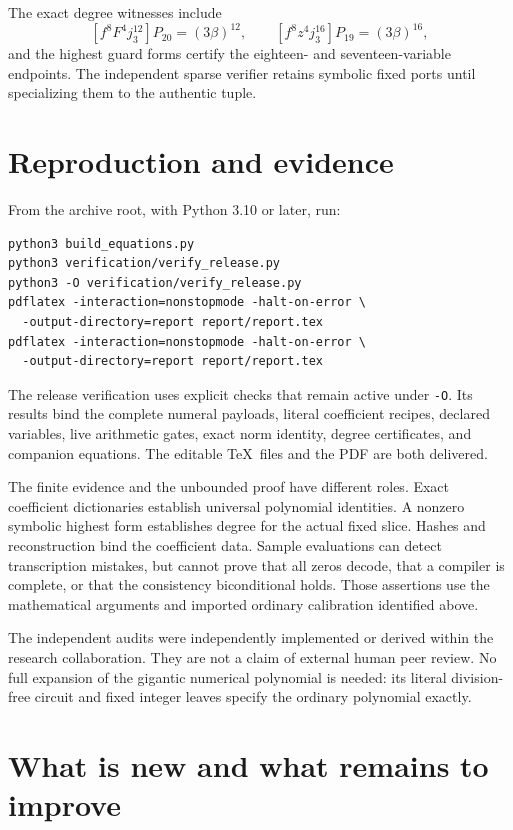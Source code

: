 \documentclass[11pt,a4paper]{article}
\theoremstyle{definition}\newtheorem{definition}[theorem]{Definition}
\theoremstyle{remark}\newtheorem{remark}[theorem]{Remark}
\numberwithin{equation}{section}
\begin{document}
The exact degree witnesses include
\[
[f^8F^4j_3^{12}]P_{20}=(3\beta)^{12},\qquad
[f^8z^4j_3^{16}]P_{19}=(3\beta)^{16},
\]
and the highest guard forms certify the eighteen- and
seventeen-variable endpoints. The independent sparse verifier
retains symbolic fixed ports until specializing them to the
authentic tuple.

\section{Reproduction and evidence}\label{sec:reproduce}

From the archive root, with Python 3.10 or later, run:
\begin{lstlisting}
python3 build_equations.py
python3 verification/verify_release.py
python3 -O verification/verify_release.py
pdflatex -interaction=nonstopmode -halt-on-error \
  -output-directory=report report/report.tex
pdflatex -interaction=nonstopmode -halt-on-error \
  -output-directory=report report/report.tex
\end{lstlisting}
The release verification uses explicit checks that remain active under
\texttt{-O}. Its results bind the complete numeral payloads,
literal coefficient recipes, declared variables, live arithmetic gates,
exact norm identity, degree certificates, and companion equations.
The editable \TeX\ files and the PDF are both delivered.

The finite evidence and the unbounded proof have different roles.
Exact coefficient dictionaries establish universal polynomial identities.
A nonzero symbolic highest form establishes degree for the actual
fixed slice. Hashes and reconstruction bind the coefficient data.
Sample evaluations can detect transcription mistakes, but cannot prove
that all zeros decode, that a compiler is complete, or that the
consistency biconditional holds. Those assertions use the mathematical
arguments and imported ordinary calibration identified above.

The independent audits were independently implemented or derived within
the research collaboration. They are not a claim of external human
peer review. No full expansion of the gigantic numerical polynomial
is needed: its literal division-free circuit and fixed integer leaves
specify the ordinary polynomial exactly.

\section{What is new and what remains to improve}\label{sec:novelty}
\end{document}
